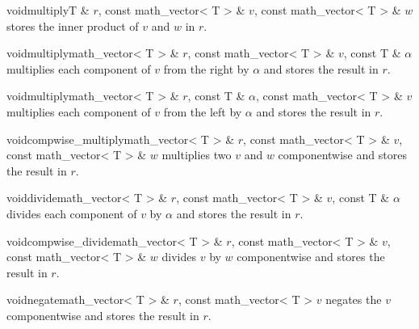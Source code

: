

\begin{fcode}{void}{multiply}{T & $r$, const math_vector< T > & $v$, const math_vector< T > & $w$}
  stores the inner product of $v$ and $w$ in $r$.
\end{fcode}

\begin{fcode}{void}{multiply}{math_vector< T > & $r$, const math_vector< T > & $v$, const T & $\alpha$}
  multiplies each component of  $v$ from the right by $\alpha$ and stores the
  result in $r$.
\end{fcode}

\begin{fcode}{void}{multiply}{math_vector< T > & $r$, const T & $\alpha$, const math_vector< T > & $v$}
  multiplies each component of  $v$ from the left by $\alpha$ and stores the
  result in $r$.
\end{fcode}

\begin{fcode}{void}{compwise_multiply}{math_vector< T > & $r$, const math_vector< T > & $v$,
    const math_vector< T > & $w$}%
  multiplies two  $v$ and $w$ componentwise and stores the result in $r$.
\end{fcode}




\begin{fcode}{void}{divide}{math_vector< T > & $r$, const math_vector< T > & $v$, const T & $\alpha$}
  divides each component of  $v$ by $\alpha$ and stores the result in $r$.
\end{fcode}

\begin{fcode}{void}{compwise_divide}{math_vector< T > & $r$, const math_vector< T > & $v$,
    const math_vector< T > & $w$}%
  divides  $v$ by $w$ componentwise and stores the result in $r$.
\end{fcode}




\begin{fcode}{void}{negate}{math_vector< T > & $r$, const math_vector< T > $v$}
  negates the  $v$ componentwise and stores the result in $r$.
\end{fcode}


